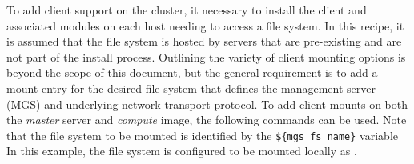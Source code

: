 To add \Lustre{} client support on the cluster, it necessary to install the client
and associated modules on each host needing to access a \Lustre{} file system.  In
this recipe, it is assumed that the \Lustre{} file system is hosted by servers
that are pre-existing and are not part of the install process. Outlining the
variety of \Lustre{} client mounting options is beyond the scope of this document,
but the general requirement is to add a mount entry for the desired file system
that defines the management server (MGS) and underlying network transport
protocol.  To add client mounts on both the {\em master} server and {\em
compute} image, the following commands can be used. Note that the \Lustre{} file
system to be mounted is identified by the \texttt{\$\{mgs\_fs\_name\}} variable 
In this example, the file system is configured to be mounted locally
as .
